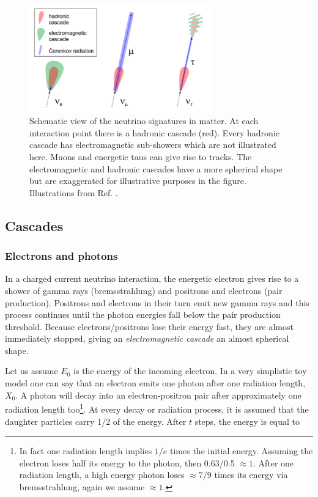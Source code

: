 \begin{figure}[t]
\centering
\includegraphics[width=0.7\textwidth]{chapter4/img/ICinteractions.png}
\caption{Schematic view of the neutrino signatures in matter. At each interaction point there is a hadronic cascade (red). Every hadronic cascade has electromagnetic sub-showers which are not illustrated here. Muons and energetic taus can give rise to tracks. The electromagnetic and hadronic cascades have a more spherical shape but are exaggerated for illustrative purposes in the figure. Illustrations from Ref. \cite{Wallraff}.}
\label{fig:ICinteractions}
\end{figure}

\subsection{Cascades}
\subsubsection{Electrons and photons}

In a charged current neutrino interaction, the energetic electron gives rise to a shower of gamma rays (bremsstrahlung) and positrons and electrons (pair production). Positrons and electrons in their turn emit new gamma rays and this process continues until the photon energies fall below the pair production threshold. Because electrons/positrons lose their energy fast, they are almost immediately stopped, giving an \textit{electromagnetic cascade} an almost spherical shape.

Let us assume $E_0$ is the energy of the incoming electron. In a very simplistic toy model one can say that an electron emits one photon after one radiation length, $X_0$. A photon will decay into an electron-positron pair after approximately one radiation length too\footnote{In fact one radiation length implies $1/e$ times the initial energy. Assuming the electron loses half its energy to the photon, then 0.63/0.5 $\approx 1$. After one radiation length, a high energy photon loses $\approx 7/9$ times its energy via bremsstrahlung, again we assume $\approx 1$.}. At every decay or radiation process, it is assumed that the daughter particles carry 1/2 of the energy. After $t$ steps, the energy is equal to

